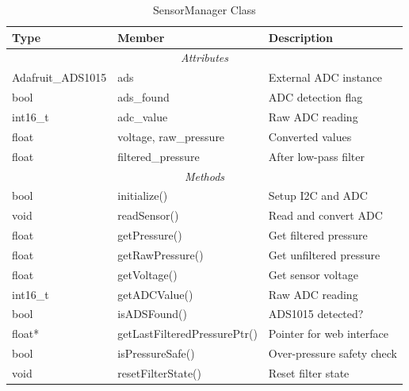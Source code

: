 \begin{table}[H]
\centering
\caption{SensorManager Class}
\label{tab:sensor-manager}
\begin{tabular}{|l|l|p{6cm}|}
\hline
\textbf{Type} & \textbf{Member} & \textbf{Description} \\
\hline
\multicolumn{3}{|c|}{\textit{Attributes}} \\
\hline
Adafruit\_ADS1015 & ads & External ADC instance \\
bool & ads\_found & ADC detection flag \\
int16\_t & adc\_value & Raw ADC reading \\
float & voltage, raw\_pressure & Converted values \\
float & filtered\_pressure & After low-pass filter \\
\hline
\multicolumn{3}{|c|}{\textit{Methods}} \\
\hline
bool & initialize() & Setup I2C and ADC \\
void & readSensor() & Read and convert ADC \\
float & getPressure() & Get filtered pressure \\
float & getRawPressure() & Get unfiltered pressure \\
float & getVoltage() & Get sensor voltage \\
int16\_t & getADCValue() & Raw ADC reading \\
bool & isADSFound() & ADS1015 detected? \\
float* & getLastFilteredPressurePtr() & Pointer for web interface \\
bool & isPressureSafe() & Over-pressure safety check \\
void & resetFilterState() & Reset filter state \\
\hline
\end{tabular}
\end{table}

